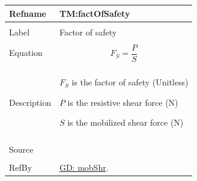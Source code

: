 \documentclass[12pt]{article}
\begin{document}
\noindent \begin{minipage}{\textwidth}
\begin{tabular}{p{} p{}}
\toprule \textbf{Refname} & \textbf{TM:factOfSafety}
\label{TM:factOfSafety}
\\ \midrule \\
Label & Factor of safety
\\ \midrule \\
Equation & \begin{displaymath}
           {F_{S}}=\frac{P}{S}
           \end{displaymath}
\\ \midrule \\
Description & \begin{symbDescription}
              \item{${F_{S}}$ is the factor of safety (Unitless)}
              \item{$P$ is the resistive shear force (N)}
              \item{$S$ is the mobilized shear force (N)}
              \end{symbDescription}
\\ \midrule \\
Source & \cite{fredlund1977}
\\ \midrule \\
RefBy & \hyperref[GD:mobShr]{GD: mobShr}.
\\ \bottomrule \end{tabular}
\end{minipage}
\par~
\end{document}
